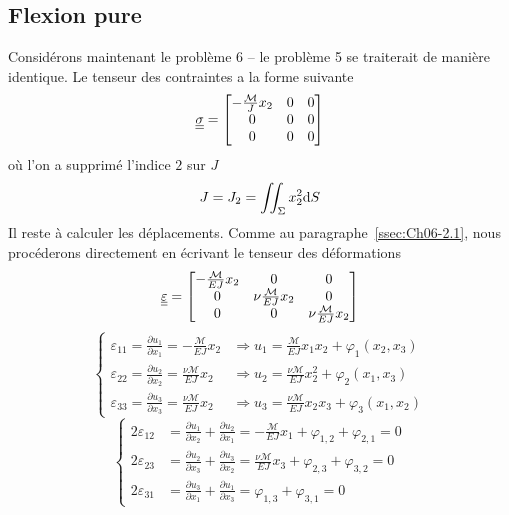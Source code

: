 \subsection{Flexion pure}
Considérons maintenant le problème 6 -- le problème 5 se traiterait de manière identique.
Le tenseur des contraintes a la forme suivante
\begin{equation}
    \underline{\underline{\sigma}} = 
    \begin{bmatrix}
        -\frac{\mathcal{M}}{J}x_2 & 0 & 0 \\
        0 & 0 & 0 \\
        0 & 0 & 0
    \end{bmatrix}
    \label{eq:Ch06-025}
\end{equation}
où l'on a supprimé l'indice $2$ sur $J$
\begin{equation}
    J=J_2 = \iint_{\Sigma} x_2^2 \mathrm{d} S
    \label{eq:Ch06-026}
\end{equation}
Il reste à calculer les déplacements.
Comme au paragraphe~\ref{ssec:Ch06-2.1}, nous procéderons directement en écrivant le tenseur des déformations
\begin{equation}
    \underline{\underline{\varepsilon}} = 
    \begin{bmatrix}
        -\frac{\mathcal{M}}{EJ}x_2 & 0 & 0 \\
        0 & \nu\frac{\mathcal{M}}{EJ}x_2 & 0 \\
        0 & 0 & \nu\frac{\mathcal{M}}{EJ}x_2
    \end{bmatrix}
    \label{eq:Ch07-027}
\end{equation}
\begin{equation}
    \left\{
    \begin{aligned}
        \varepsilon_{11} = \frac{\partial u_1}{\partial x_1} = -\frac{\mathcal{M}}{EJ}x_2 & \Rightarrow u_1 = \frac{\mathcal{M}}{EJ}x_1x_2 + \varphi_1 \left( x_2,x_3 \right) \\
        \varepsilon_{22} = \frac{\partial u_2}{\partial x_2} = \frac{\nu\mathcal{M}}{EJ}x_2 & \Rightarrow u_2 = \frac{\nu\mathcal{M}}{EJ}x_2^2 + \varphi_2 \left( x_1,x_3 \right) \\
        \varepsilon_{33} = \frac{\partial u_3}{\partial x_3} = \frac{\nu\mathcal{M}}{EJ}x_2 & \Rightarrow u_3 = \frac{\nu\mathcal{M}}{EJ}x_2x_3 + \varphi_3 \left( x_1,x_2 \right)
    \end{aligned}
    \right.
    \label{eq:Ch07-028}
\end{equation}
\begin{equation}
    \left\{
    \begin{aligned}
        2 \varepsilon_{12} &= \frac{\partial u_1}{\partial x_2} + \frac{\partial u_2}{\partial x_1} = - \frac{\mathcal{M}}{EJ}x_1 + \varphi_{1,2} + \varphi_{2,1} = 0 \\
        2 \varepsilon_{23} &= \frac{\partial u_2}{\partial x_3} + \frac{\partial u_3}{\partial x_2} = \frac{\nu\mathcal{M}}{EJ}x_3 + \varphi_{2,3} + \varphi_{3,2} = 0 \\
        2 \varepsilon_{31} &= \frac{\partial u_3}{\partial x_1} + \frac{\partial u_1}{\partial x_3} = \varphi_{1,3} + \varphi_{3,1} = 0
    \end{aligned}
    \right.
    \label{eq:Ch07-029}
\end{equation}
